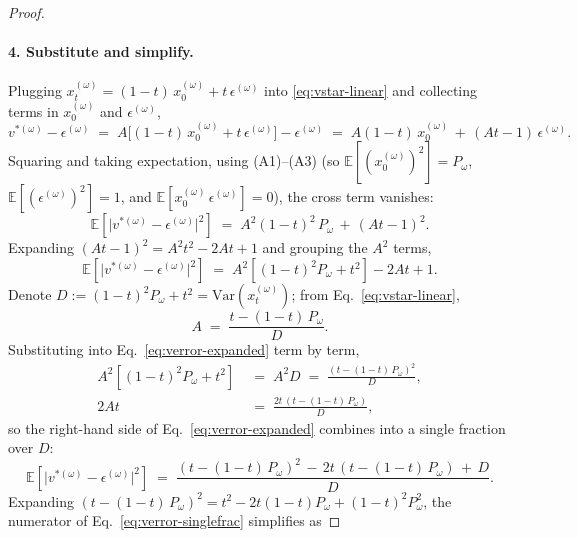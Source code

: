 \begin{proof}
\paragraph{4. Substitute and simplify.} Plugging $x_t^{(\omega)} = (1-t)\, x_0^{(\omega)} + t\,\epsilon^{(\omega)}$ into \eqref{eq:vstar-linear} and collecting terms in $x_0^{(\omega)}$ and $\epsilon^{(\omega)}$,
\begin{equation}
  v^{*(\omega)} - \epsilon^{(\omega)}
  \;=\; A\bigl[(1-t)\,x_0^{(\omega)} + t\,\epsilon^{(\omega)}\bigr] - \epsilon^{(\omega)}
  \;=\; A(1-t)\,x_0^{(\omega)} \,+\, (At - 1)\,\epsilon^{(\omega)}.
\end{equation}
Squaring and taking expectation, using (A1)--(A3) (so $\mathbb{E}[(x_0^{(\omega)})^2] = P_\omega$, $\mathbb{E}[(\epsilon^{(\omega)})^2] = 1$, and $\mathbb{E}[x_0^{(\omega)}\,\epsilon^{(\omega)}] = 0$), the cross term vanishes:
\begin{equation}
  \mathbb{E}\!\left[\bigl|v^{*(\omega)} - \epsilon^{(\omega)}\bigr|^2\right]
  \;=\; A^2 (1-t)^2\,P_\omega \,+\, (At - 1)^2.
\end{equation}
Expanding $(At-1)^2 = A^2 t^2 - 2At + 1$ and grouping the $A^2$ terms,
\begin{equation}
  \mathbb{E}\!\left[\bigl|v^{*(\omega)} - \epsilon^{(\omega)}\bigr|^2\right]
  \;=\; A^2\!\left[(1-t)^2 P_\omega + t^2\right] - 2At + 1.
  \label{eq:verror-expanded}
\end{equation}
Denote $D := (1-t)^2 P_\omega + t^2 = \mathrm{Var}(x_t^{(\omega)})$; from Eq.~\eqref{eq:vstar-linear},
\begin{equation}
  A \;=\; \frac{t - (1-t)\, P_\omega}{D}.
  \label{eq:A-in-D}
\end{equation}
Substituting into Eq.~\eqref{eq:verror-expanded} term by term,
\begin{align}
  A^2\!\left[(1-t)^2 P_\omega + t^2\right] \;&=\; A^2 D \;=\; \frac{(t - (1-t)\, P_\omega)^2}{D}, \\
  2At \;&=\; \frac{2t\,(t - (1-t)\, P_\omega)}{D},
\end{align}
so the right-hand side of Eq.~\eqref{eq:verror-expanded} combines into a single fraction over $D$:
\begin{equation}
  \mathbb{E}\!\left[\bigl|v^{*(\omega)} - \epsilon^{(\omega)}\bigr|^2\right]
  \;=\; \frac{(t - (1-t)\, P_\omega)^2 \,-\, 2t\,(t - (1-t)\, P_\omega) \,+\, D}{D}.
  \label{eq:verror-singlefrac}
\end{equation}
Expanding $(t - (1-t)\, P_\omega)^2 = t^2 - 2t(1-t) P_\omega + (1-t)^2 P_\omega^2$, the numerator of Eq.~\eqref{eq:verror-singlefrac} simplifies as

\end{proof}
